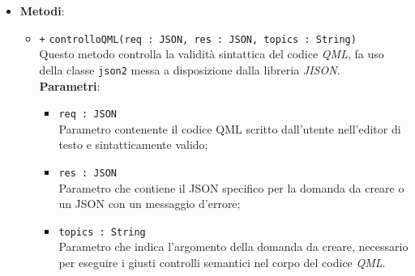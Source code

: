 \begin{itemize}
\begin{itemize}
	\end{itemize}
	\item \textbf{Metodi}:
	\begin{itemize}
		\item \texttt{+} \texttt{controlloQML(req : JSON, res : JSON, topics : String)} \\ 
		Questo metodo controlla la validità sintattica del codice \textit{QML}, fa uso della classe \texttt{json2} messa a disposizione dalla libreria \textit{JISON}. \\
		\textbf{Parametri}:
		\begin{itemize}
			\item \texttt{req : JSON} \\
			Parametro contenente il codice QML scritto dall'utente nell'editor di testo e sintatticamente valido;
			\item \texttt{res : JSON} \\
			Parametro che contiene il JSON specifico per la domanda da creare o un JSON con un messaggio d'errore;
			\item \texttt{topics : String} \\
			Parametro che indica l'argomento della domanda da creare, necessario per eseguire i giusti controlli semantici nel corpo del codice \textit{QML}.
		\end{itemize}
	\end{itemize}
\end{itemize}

